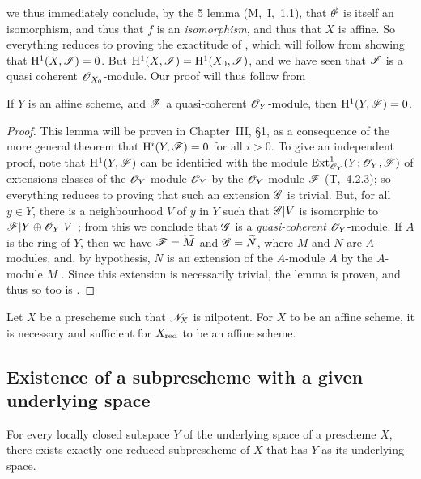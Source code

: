 we thus immediately conclude, by the 5 lemma (M,~I,~1.1), that $\theta^\sharp$ is itself an isomorphism, and thus that $f$ is an \emph{isomorphism}, and thus that $X$ is affine.
So everything reduces to proving the exactitude of , which will follow from showing that $\mathrm{H}^1(X,\mathscr{I})=0$.
But $\mathrm{H}^1(X,\mathscr{I})=\mathrm{H}^1(X_0,\mathscr{I})$, and we have seen that $\mathscr{I}$ is a quasi coherent $\mathscr{O}_{X_0}$-module.
Our proof will thus follow from
\begin{lemma}[5.1.9.2]
\label{1.5.1.9.2}
If $Y$ is an affine scheme, and $\mathscr{F}$ a quasi-coherent $\mathscr{O}_Y$-module, then $\mathrm{H}^1(Y,\mathscr{F})=0$.
\end{lemma}

\begin{proof}
\label{proof-1.5.1.9}
This lemma will be proven in Chapter~III, §1, as a consequence of the more general theorem that $\mathrm{H}^i(Y,\mathscr{F})=0$ for all $i>0$.
To give an independent proof, note that $\mathrm{H}^1(Y,\mathscr{F})$ can be identified with the module $\operatorname{Ext}_{\mathscr{O}_Y}^1(Y;\mathscr{O}_Y,\mathscr{F})$ of extensions classes of the $\mathscr{O}_Y$-module $\mathscr{O}_Y$ by the $\mathscr{O}_Y$-module $\mathscr{F}$ (T,~4.2.3);
so everything reduces to proving that such an extension $\mathscr{G}$ is trivial.
But, for all $y\in Y$, there is a neighbourhood $V$ of $y$ in $Y$ such that $\mathscr{G}|V$ is isomorphic to $\mathscr{F}|Y\oplus\mathscr{O}_Y|V$ ;
from this we conclude that $\mathscr{G}$ is a \emph{quasi-coherent} $\mathscr{O}_Y$-module.
If $A$ is the ring of $Y$, then we have $\mathscr{F}=\widetilde{M}$ and $\mathscr{G}=\widetilde{N}$, where $M$ and $N$ are $A$-modules, and, by hypothesis, $N$ is an extension of the $A$-module $A$ by the $A$-module $M$ .
Since this extension is necessarily trivial, the lemma is proven, and thus so too is .
\end{proof}

\begin{corollary}[5.1.10]
\label{1.5.1.10}
Let $X$ be a prescheme such that $\mathscr{N}_X$ is nilpotent.
For $X$ to be an affine scheme, it is necessary and sufficient for $X_{\mathrm{red}}$ to be an affine scheme.
\end{corollary}

\subsection{Existence of a subprescheme with a given underlying space}
\label{subsection:1.5.2}

\begin{proposition}[5.2.1]
\label{1.5.2.1}
For every locally closed subspace $Y$ of the underlying space of a prescheme $X$, there exists exactly one reduced subprescheme of $X$ that has $Y$ as its underlying space.
\end{proposition}

